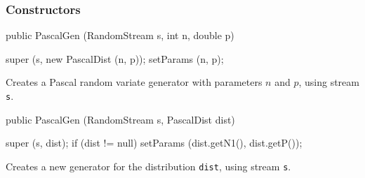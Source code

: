 \subsubsection* {Constructors}
\begin{code}

   public PascalGen (RandomStream s, int n, double p)\begin{hide} {
      super (s, new PascalDist (n, p));
      setParams (n, p);
   }\end{hide}
\end{code}
  \begin{tabb}
  Creates a Pascal random variate generator with parameters $n$ and $p$,
  using stream \texttt{s}.
 \end{tabb}
\begin{code}

   public PascalGen (RandomStream s, PascalDist dist)\begin{hide} {
      super (s, dist);
      if (dist != null)
         setParams (dist.getN1(), dist.getP());
   }\end{hide}
\end{code}
  \begin{tabb}
  Creates a new generator for the distribution \texttt{dist}, using
  stream \texttt{s}.
 \end{tabb}



